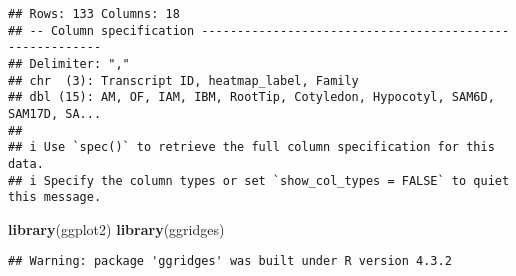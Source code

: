 \documentclass[
]{article}
\newenvironment{Shaded}{\begin{snugshade}}{\end{snugshade}}
\newcommand{\AttributeTok}[1]{\textcolor[rgb]{0.13,0.29,0.53}{#1}}
\newcommand{\CommentTok}[1]{\textcolor[rgb]{0.56,0.35,0.01}{\textit{#1}}}
\newcommand{\ConstantTok}[1]{\textcolor[rgb]{0.56,0.35,0.01}{#1}}
\newcommand{\DecValTok}[1]{\textcolor[rgb]{0.00,0.00,0.81}{#1}}
\newcommand{\FunctionTok}[1]{\textcolor[rgb]{0.13,0.29,0.53}{\textbf{#1}}}
\newcommand{\NormalTok}[1]{#1}
\newcommand{\OtherTok}[1]{\textcolor[rgb]{0.56,0.35,0.01}{#1}}
\newcommand{\SpecialCharTok}[1]{\textcolor[rgb]{0.81,0.36,0.00}{\textbf{#1}}}
\newcommand{\StringTok}[1]{\textcolor[rgb]{0.31,0.60,0.02}{#1}}
\begin{document}
\begin{verbatim}
## Rows: 133 Columns: 18
## -- Column specification --------------------------------------------------------
## Delimiter: ","
## chr  (3): Transcript ID, heatmap_label, Family
## dbl (15): AM, OF, IAM, IBM, RootTip, Cotyledon, Hypocotyl, SAM6D, SAM17D, SA...
## 
## i Use `spec()` to retrieve the full column specification for this data.
## i Specify the column types or set `show_col_types = FALSE` to quiet this message.
\end{verbatim}

\begin{Shaded}
\begin{Highlighting}[]
\FunctionTok{library}\NormalTok{(ggplot2)}
\FunctionTok{library}\NormalTok{(ggridges)}
\end{Highlighting}
\end{Shaded}

\begin{verbatim}
## Warning: package 'ggridges' was built under R version 4.3.2
\end{verbatim}

\begin{Shaded}
\end{Shaded}
\end{document}
